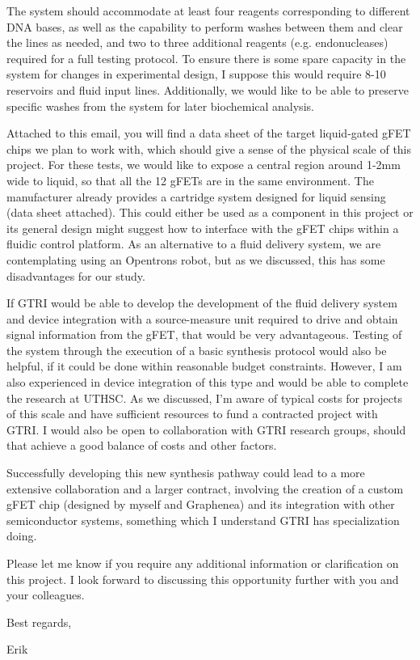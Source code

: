 The system should accommodate at least four reagents corresponding to different DNA bases, as well as the capability to perform washes between them and clear the lines as needed, and two to three additional reagents (e.g. endonucleases) required for a full testing protocol. To ensure there is some spare capacity in the system for changes in experimental design, I suppose this would require 8-10 reservoirs and fluid input lines. Additionally, we would like to be able to preserve specific washes from the system for later biochemical analysis.

Attached to this email, you will find a data sheet of the target liquid-gated gFET chips we plan to work with, which should give a sense of the physical scale of this project. For these tests, we would like to expose a central region around 1-2mm wide to liquid, so that all the 12 gFETs are in the same environment. The manufacturer already provides a cartridge system designed for liquid sensing (data sheet attached). This could either be used as a component in this project or its general design might suggest how to interface with the gFET chips within a fluidic control platform. As an alternative to a fluid delivery system, we are contemplating using an Opentrons robot, but as we discussed, this has some disadvantages for our study.

If GTRI would be able to develop the development of the fluid delivery system and device integration with a source-measure unit required to drive and obtain signal information from the gFET, that would be very advantageous. Testing of the system through the execution of a basic synthesis protocol would also be helpful, if it could be done within reasonable budget constraints. However, I am also experienced in device integration of this type and would be able to complete the research at UTHSC. As we discussed, I'm aware of typical costs for projects of this scale and have sufficient resources to fund a contracted project with GTRI. I would also be open to collaboration with GTRI research groups, should that achieve a good balance of costs and other factors.

Successfully developing this new synthesis pathway could lead to a more extensive collaboration and a larger contract, involving the creation of a custom gFET chip (designed by myself and Graphenea) and its integration with other semiconductor systems, something which I understand GTRI has specialization doing.

Please let me know if you require any additional information or clarification on this project. I look forward to discussing this opportunity further with you and your colleagues.

Best regards,

Erik


